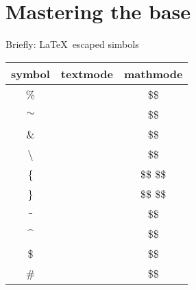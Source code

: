 \documentclass[14pt, aspectratio=169]{beamer}
\begin{document}


\section{Mastering the base}



\begin{frame}[fragile]{Briefly: \LaTeX\ escaped simbols}\relax
\newcommand{\mccol}[1]{{\csk \$\ccol{#1}\$}}

\begin{center}
\begin{tabular}{c|cc}
    symbol & textmode & mathmode\\\hline
    \% & \ccol{\%} & \mccol{\%}\\ 
    $\sim$ & \ccol{\~} \ccol{\textasciitilde} & \mccol{\sim}\\ 
    \& &  \ccol{\&} &\mccol{\&}\\ 
    \textbackslash  & \ccol{\textbackslash} & \mccol{\backslash}\\ 
    \{ & \ccol{\{} \ccol{\textbraceleft} \ccol{\lbrace} & \mccol{\{} \mccol{\lbrace}\\
    \} & \ccol{\}} \ccol{\textbraceright} \ccol{\rbrace} & \mccol{\}} \mccol{\rbrace}\\
    $\_$ & \ccol{\_} & \mccol{\_}\\ 
    $\^$ & \ccol{\^} \ccol{\textasciicircum} & \mccol{\^}\\ 
    \$ & \ccol{\$} & \mccol{\$}\\ 
    \# & \ccol{\#} & \mccol{\#}
    
\end{tabular}
\end{center}
\end{frame}
\end{document}
